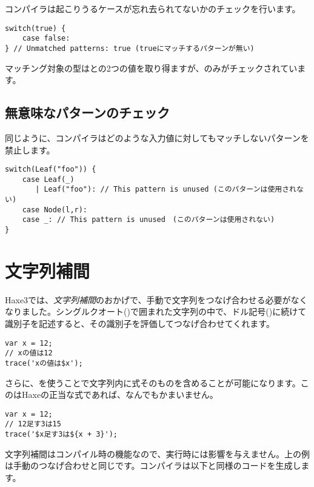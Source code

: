 コンパイラは起こりうるケースが忘れ去られてないかのチェックを行います。

\begin{lstlisting}
switch(true) {
    case false:
} // Unmatched patterns: true (trueにマッチするパターンが無い)
\end{lstlisting}

マッチング対象の型はとの2つの値を取り得ますが、のみがチェックされています。


\subsection{無意味なパターンのチェック}
\label{lf-pattern-matching-unused}

同じように、コンパイラはどのような入力値に対してもマッチしないパターンを禁止します。

\begin{lstlisting}
switch(Leaf("foo")) {
    case Leaf(_)
       | Leaf("foo"): // This pattern is unused (このパターンは使用されない)
    case Node(l,r):
    case _: // This pattern is unused　(このパターンは使用されない)
}
\end{lstlisting}

\section{文字列補間}
\label{lf-string-interpolation}

Haxe3では、\emph{文字列補間}のおかげで、手動で文字列をつなげ合わせる必要がなくなりました。シングルクオート()で囲まれた文字列の中で、ドル記号(\expr{\$})に続けて識別子を記述すると、その識別子を評価してつなげ合わせてくれます。

\begin{lstlisting}
var x = 12;
// xの値は12
trace('xの値は$x');
\end{lstlisting}

さらに、を使うことで文字列内に式そのものを含めることが可能になります。このはHaxeの正当な式であれば、なんでもかまいません。

\begin{lstlisting}
var x = 12;
// 12足す3は15
trace('$x足す3は${x + 3}');
\end{lstlisting}

文字列補間はコンパイル時の機能なので、実行時には影響を与えません。上の例は手動のつなげ合わせと同じです。コンパイラは以下と同様のコードを生成します。

